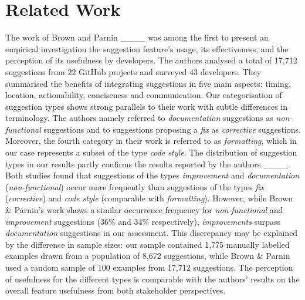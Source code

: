 \section{Related Work}
\label{sec:relwork}

The work of Brown and Parnin ____ was among the first to present an empirical investigation the suggestion feature's usage, its effectiveness, and the perception of its usefulness by developers.
The authors analysed a total of 17,712 suggestions from 22 GitHub projects and surveyed 43 developers.
They summarised the benefits of integrating suggestions in five main aspects: timing, location, actionability, conciseness and communication.
Our categorisation of suggestion types shows strong parallels to their work  with subtle differences in  terminology.
The authors namely referred to \textit{documentation} suggestions as \textit{non-functional} suggestions and to suggestions proposing a \textit{fix} as \textit{corrective} suggestions.
Moreover, the fourth category in their work is referred to as \textit{formatting}, which in our case represents a subset of the type \textit{code style}.
The distribution of suggestion types in our results partly confirms the results reported by the authors ____.
Both studies found that suggestions of the types \textit{improvement} and \textit{documentation}  (\textit{non-functional}) occur more  frequently than suggestions of the types \textit{fix} (\textit{corrective}) and \textit{code style} (comparable with \textit{formatting}).
However, while Brown \& Parnin's work shows a similar occurrence frequency for \textit{non-functional} and \textit{improvement} suggestions (36\% and 34\% respectively), \textit{improvements} surpass \textit{documentation} suggestions in our assessment.
This discrepancy may be explained  by the difference in sample sizes: our sample contained 1,775 manually labelled examples drawn from a population of 8,672 suggestions, while Brown \& Parnin used a random sample of 100 examples from 17,712 suggestions.
The perception of usefulness for the different types is comparable with the authors' results on the overall feature usefulness from both stakeholder perspectives.

